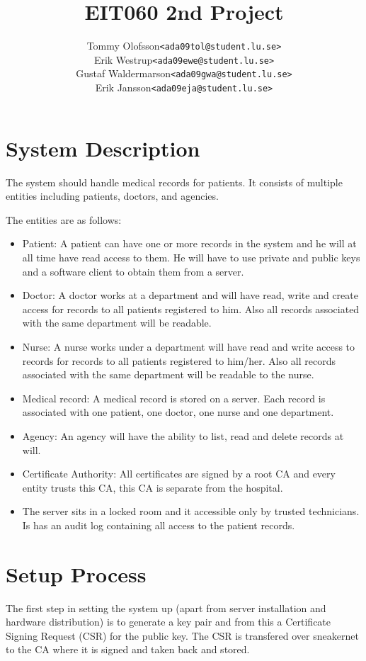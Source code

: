 \documentclass[10pt, a4paper]{article}
\title{EIT060 2nd Project}
\date{}
\author{
	\begin{tabular}{l l}
		Tommy Olofsson & \texttt{<ada09tol@student.lu.se>}\\
		Erik Westrup & \texttt{<ada09ewe@student.lu.se>}\\
		Gustaf Waldermarson & \texttt{<ada09gwa@student.lu.se>}\\
		Erik Jansson & \texttt{<ada09eja@student.lu.se>}
	\end{tabular}
}
\begin{document}
\begin{titlepage}
\maketitle
\begin{center}
\end{center}

\thispagestyle{empty}
\end{titlepage}
\setcounter{page}{2}
\section{System Description}
The system should handle medical records for patients. It consists of multiple entities including patients, doctors, and agencies. %

The entities are as follows:
\begin{itemize}
\item Patient: A patient can have one or more records in the system and he will at all time have read access to them. He will have to use private and public keys and a software client to obtain them from a server. 
\item Doctor: A doctor works at a department and will have read, write and create access for records to all patients registered to him. Also all records associated with the same department will be readable.
\item Nurse: A nurse works under a department will have read and write access to records for records to all patients registered to him/her. Also all records associated with the same department will be readable to the nurse.
\item Medical record: A medical record is stored on a server. Each record is associated with one patient, one doctor, one nurse and one department.
\item Agency: An agency will have the ability to list, read and delete records at will.
\item Certificate Authority: All certificates are signed by a root CA and every entity trusts this CA, this CA is separate from the hospital.
\item The server sits in a locked room and it accessible only by trusted technicians. Is has an audit log containing all access to the patient records.
\end{itemize}

\section{Setup Process}
The first step in setting the system up (apart from server installation and hardware distribution) is to generate a key pair and from this a Certificate Signing Request (CSR) for the public key. The CSR is transfered over sneakernet to the CA where it is signed and taken back and stored. 
\end{document}
